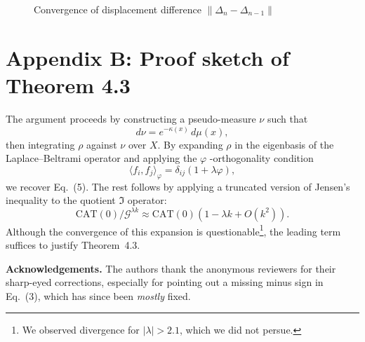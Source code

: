 \documentclass{amsart}
\begin{document}
\begin{figure}[htbp]
\centering
{}
\caption{Convergence of displacement %
difference $\|\Delta_n - \Delta_{n-1}\|$%
}
\end{figure}

\section{Appendix B: Proof sketch of Theorem 4.3}

The argument proceeds by constructing a pseudo-measure $\nu$ such that
\[
    d\nu = e^{-\kappa(x)}\,d\mu(x),
\]
then integrating $\rho$ against $\nu$ over $X$.  
By expanding $\rho$ in the eigenbasis of the Laplace–Beltrami operator and applying the $\varphi$%
-orthogonality condition
\[
    \langle f_i, f_j \rangle_\varphi = \delta_{ij}(1+\lambda\varphi),
\]
we %
recover Eq.~(5).  
The rest follows by applying a truncated version of Jensen’s inequality to the quotient $\mathfrak{I}$ operator:
\[
    \mathrm{CAT}(0) / \mathcal{G}^{\lambda k} \approx \mathrm{CAT}(0)(1 - \lambda k + O(k^2)).
\]
Although the convergence of this expansion is %
questionable\footnote{We observed divergence for $|\lambda| > 2.1$, which we did not persue.}, the %
leading term suffices to justify %
Theorem~4.3.

\bigskip

\noindent
\textbf{Acknowledgements.} %
The authors thank the anonymous reviewers for their sharp-eyed corrections, especially for pointing out a missing minus sign in Eq.~(3), which has since been \emph{mostly} fixed.
\end{document}
